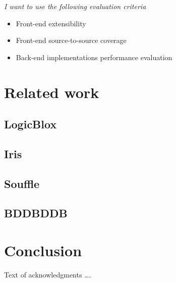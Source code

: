 \documentclass[sigplan,10pt]{acmart}
\begin{document}
\textit{I want to use the following evaluation criteria}
\begin{itemize}
\item Front-end extensibility
\item Front-end source-to-source coverage
\item Back-end implementations performance evaluation
\end{itemize}

\section{Related work}
\subsection{LogicBlox}
\subsection{Iris}
\subsection{Souffle}
\subsection{BDDBDDB}
\section{Conclusion}
\begin{acks}
Text of acknowledgments \ldots.
\end{acks}



\end{document}

